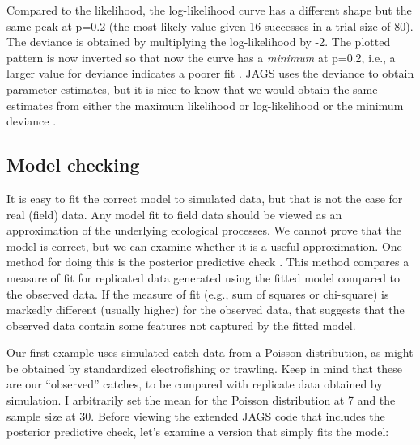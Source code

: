 \documentclass[
]{krantz}
\begin{document}
Compared to the likelihood, the log-likelihood curve has a different shape but the same peak at p=0.2 (the most likely value given 16 successes in a trial size of 80). The deviance is obtained by multiplying the log-likelihood by -2. The plotted pattern is now inverted so that now the curve has a \emph{minimum} at p=0.2, i.e., a larger value for deviance indicates a poorer fit \citep{mccarthy_2007}. JAGS uses the deviance to obtain parameter estimates, but it is nice to know that we would obtain the same estimates from either the maximum likelihood or log-likelihood or the minimum deviance \citep{mccarthy_2007}.

\hypertarget{Model-checking}{%
\subsection{Model checking}\label{Model-checking}}

It is easy to fit the correct model to simulated data, but that is not the case for real (field) data. Any model fit to field data should be viewed as an approximation of the underlying ecological processes. We cannot prove that the model is correct, but we can examine whether it is a useful approximation. One method for doing this is the posterior predictive check \citep{gelman.hill_2007, kéry_2010, kéry.schaub_2012, conn.etal_2018}. This method compares a measure of fit for replicated data generated using the fitted model compared to the observed data. If the measure of fit (e.g., sum of squares or chi-square) is markedly different (usually higher) for the observed data, that suggests that the observed data contain some features not captured by the fitted model.

Our first example uses simulated catch data from a Poisson distribution, as might be obtained by standardized electrofishing or trawling. Keep in mind that these are our ``observed'' catches, to be compared with replicate data obtained by simulation. I arbitrarily set the mean for the Poisson distribution at 7 and the sample size at 30. Before viewing the extended JAGS code that includes the posterior predictive check, let's examine a version that simply fits the model:
\end{document}
